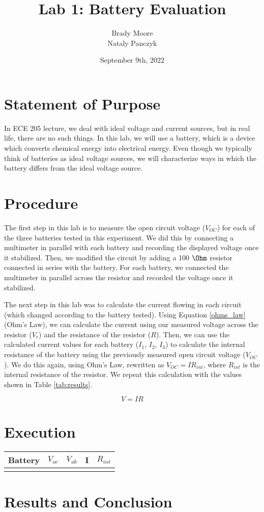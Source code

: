 \documentclass{report}
\title{Lab 1: Battery Evaluation}
\date{September 9th, 2022}
\author{Brady Moore \\
    Nataly Panczyk}
\begin{document}
\maketitle
\section{Statement of Purpose}
In ECE 205 lecture, we deal with ideal voltage and current sources, but in real life, there are no such things.
In this lab, we will use a battery, which is a device which converts chemical energy into electrical energy.
Even though we typically think of batteries as ideal voltage sources, we will characterize ways in which the battery differs from the ideal voltage source.

\section{Procedure}
The first step in this lab is to measure the open circuit voltage ($V_{OC}$) for each of the three batteries tested in this experiment.
We did this by connecting a multimeter in parallel with each battery and recording the displayed voltage once it stabilized. Then, we modified
the circuit by adding a 100 $\Ohm$ resistor connected in series with the battery. For each battery, we connected the multimeter in parallel
across the resistor and recorded the voltage once it stabilized. \par
The next step in this lab was to calculate the current flowing in each circuit (which changed according to the battery tested). Using Equation \ref{ohms_law}
(Ohm's Law), we can calculate the current using our measured voltage across the resistor ($V_r$) and the resistance of the resistor ($R$).
Then, we can use the calculated current values for each battery ($I_1$, $I_2$, $I_3$) to calculate the internal resistance of the battery using
the previously measured open circuit voltage ($V_{OC}$). We do this again, using Ohm's Law, rewritten as $V_{OC} = IR_{int}$, where $R_{int}$
is the internal resistance of the resistor. We repeat this calculation with the values shown in Table \ref{tab:results}.

    \begin{equation}
        \label{ohms_law}
        V = IR
    \end{equation}
\section{Execution}
    \begin{tabular}{|c c c c c|}
        \hline
        Battery & $V_{oc}$ & $V_{ab}$ & I & $R_{int}$\\
        \hline
                &       &       &       &
        \hline
    \end{tabular}
\section{Results and Conclusion}
\end{document}
